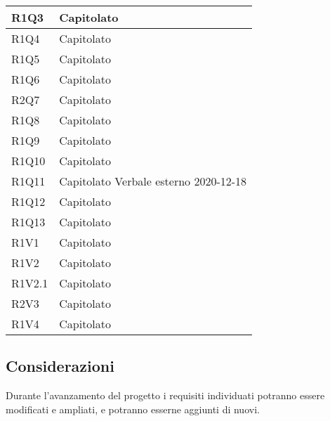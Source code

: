 \begin{center}
\begin{longtable}{|p{22mm}|p{22mm}|}
R1Q3	& Capitolato\\
\hline
R1Q4	& Capitolato\\
\hline
R1Q5	& Capitolato\\
\hline
R1Q6	& Capitolato\\
\hline
R2Q7	& Capitolato\\
\hline
R1Q8	& Capitolato\\
\hline
R1Q9	& Capitolato\\
\hline
R1Q10	& Capitolato\\
\hline
R1Q11	& Capitolato\newline	
Verbale esterno 2020-12-18 
\\
\hline
R1Q12	& Capitolato\\
\hline
R1Q13	& Capitolato\\
\hline
R1V1	& Capitolato\\
	\hline
R1V2	& Capitolato\\
	\hline
R1V2.1	& Capitolato\\
	\hline
R2V3	& Capitolato\\
	\hline
R1V4	& Capitolato\\
	\hline
	
	\end{longtable}
\end{center}

\subsection{Considerazioni}
Durante l'avanzamento del progetto i requisiti individuati potranno essere modificati e ampliati, e potranno esserne aggiunti di nuovi.